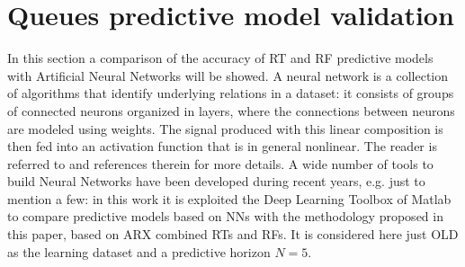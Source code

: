 \section{Queues predictive model validation}

In this section a comparison of the accuracy of RT and RF predictive models with Artificial Neural Networks will be showed. A neural network is a collection of algorithms that identify underlying relations in a dataset: it consists of groups of connected neurons organized in layers, where the connections between neurons are modeled using weights. The signal produced with this linear composition is then fed into an activation function that is in general nonlinear. The reader is referred to \cite{NNstateOfART} and references therein for more details. A wide number of tools to build Neural Networks have been developed during recent years, e.g. \cite{tensorflow2015,chollet2015keras,openNN} just to mention a few: in this work it is exploited the Deep Learning Toolbox of Matlab to compare predictive models based on NNs with the methodology proposed in this paper, based on ARX combined RTs and RFs. It is considered here just OLD as the learning dataset and a predictive horizon $N=5$.

